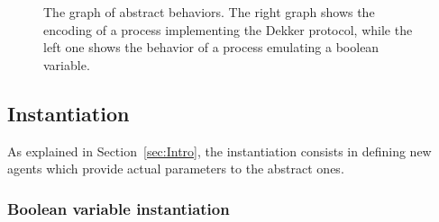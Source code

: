 \documentclass[10pt,a4paper]{article}
\begin{document}
    \begin{figure}[Htbp]
        \centering
        \label{pic:Protocol}
        \caption{
            The graph of abstract behaviors. The right graph shows the
            encoding of a process implementing the Dekker protocol, while
            the left one shows the behavior of a process emulating a
            boolean variable.
        }
    \end{figure}

    \subsection{Instantiation}
    \label{subsec:Instantiation}

        As explained in Section~\ref{sec:Intro}, the instantiation
        consists in defining new agents which provide actual parameters to
        the abstract ones.

        \subsubsection{Boolean variable instantiation}
\end{document}

